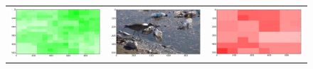 \begin{figure}[h!tb]
\begin{minipage}{1.3\textwidth}
\begin{tabular}{ccc}
\includegraphics[keepaspectratio=true,width=\segwidth]{images/segment/701_11__animals__.png} &
\includegraphics[keepaspectratio=true,width=\segwidth]{images/segment/701_11__image__.png} &
\includegraphics[keepaspectratio=true,width=\segwidth]{images/segment/701_11__plastic__.png} \\


\end{tabular}
\end{minipage}
\end{figure}
